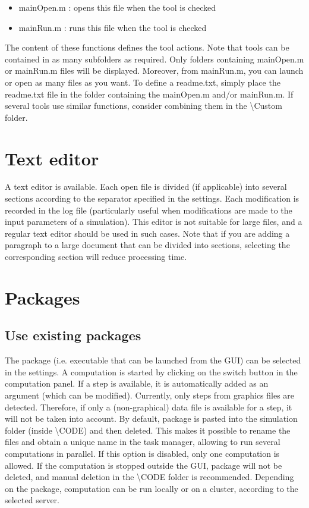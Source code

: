\documentclass{article}
\begin{document}
\begin{itemize}
    \item mainOpen.m : opens this file when the tool is checked
    \item mainRun.m : runs this file when the tool is checked
\end{itemize}

The content of these functions defines the tool actions. Note that tools can be contained in as many subfolders as required. Only folders containing mainOpen.m or mainRun.m files will be displayed. Moreover, from mainRun.m, you can launch or open as many files as you want. To define a readme.txt, simply place the readme.txt file in the folder containing the mainOpen.m and/or mainRun.m. If several tools use similar functions, consider combining them in the \textbackslash Custom folder.

\section{Text editor}

A text editor is available. Each open file is divided (if applicable) into several sections according to the separator specified in the settings. Each modification is recorded in the log file (particularly useful when modifications are made to the input parameters of a simulation). This editor is not suitable for large files, and a regular text editor should be used in such cases. Note that if you are adding a paragraph to a large document that can be divided into sections, selecting the corresponding section will reduce processing time.

\section{Packages}

\subsection{Use existing packages}

The package (i.e. executable that can be launched from the GUI) can be selected in the settings. A computation is started by clicking on the switch button in the computation panel. If a step is available, it is automatically added as an argument (which can be modified). Currently, only steps from graphics files are detected. Therefore, if only a (non-graphical) data file is available for a step, it will not be taken into account. By default, package is pasted into the simulation folder (inside \textbackslash CODE) and then deleted. This makes it possible to rename the files and obtain a unique name in the task manager, allowing to run several computations in parallel. If this option is disabled, only one computation is allowed. If the computation is stopped outside the GUI, package will not be deleted, and manual deletion in the \textbackslash CODE folder is recommended. Depending on the package, computation can be run locally or on a cluster, according to the selected server.
\end{document}
